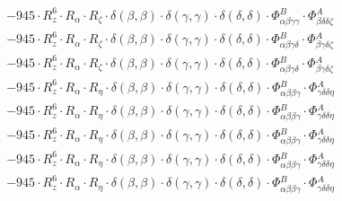 \documentclass{article}
\begin{document}
\begin{subequations}
\begin{gather}
\begin{array}{c}
 \\[0.2em] 		 - 945 \cdot R_{z}^{6} \cdot R_{\alpha{}} \cdot R_{\zeta{}} \cdot \delta{}\left(\beta{}, \beta{}\right) \cdot \delta{}\left(\gamma{}, \gamma{}\right) \cdot \delta{}\left(\delta{}, \delta{}\right) \cdot \Phi{}^{B}_{\alpha{}\beta{}\gamma{}\gamma{}} \cdot \Phi{}^{A}_{\beta{}\delta{}\delta{}\zeta{}} 
 \\[0.2em] 		 - 945 \cdot R_{z}^{6} \cdot R_{\alpha{}} \cdot R_{\zeta{}} \cdot \delta{}\left(\beta{}, \beta{}\right) \cdot \delta{}\left(\gamma{}, \gamma{}\right) \cdot \delta{}\left(\delta{}, \delta{}\right) \cdot \Phi{}^{B}_{\alpha{}\beta{}\gamma{}\delta{}} \cdot \Phi{}^{A}_{\beta{}\gamma{}\delta{}\zeta{}} 
 \\[0.2em] 		 - 945 \cdot R_{z}^{6} \cdot R_{\alpha{}} \cdot R_{\zeta{}} \cdot \delta{}\left(\beta{}, \beta{}\right) \cdot \delta{}\left(\gamma{}, \gamma{}\right) \cdot \delta{}\left(\delta{}, \delta{}\right) \cdot \Phi{}^{B}_{\alpha{}\beta{}\gamma{}\delta{}} \cdot \Phi{}^{A}_{\beta{}\gamma{}\delta{}\zeta{}} 
 \\[0.2em] 		 - 945 \cdot R_{z}^{6} \cdot R_{\alpha{}} \cdot R_{\eta{}} \cdot \delta{}\left(\beta{}, \beta{}\right) \cdot \delta{}\left(\gamma{}, \gamma{}\right) \cdot \delta{}\left(\delta{}, \delta{}\right) \cdot \Phi{}^{B}_{\alpha{}\beta{}\beta{}\gamma{}} \cdot \Phi{}^{A}_{\gamma{}\delta{}\delta{}\eta{}} 
 \\[0.2em] 		 - 945 \cdot R_{z}^{6} \cdot R_{\alpha{}} \cdot R_{\eta{}} \cdot \delta{}\left(\beta{}, \beta{}\right) \cdot \delta{}\left(\gamma{}, \gamma{}\right) \cdot \delta{}\left(\delta{}, \delta{}\right) \cdot \Phi{}^{B}_{\alpha{}\beta{}\beta{}\gamma{}} \cdot \Phi{}^{A}_{\gamma{}\delta{}\delta{}\eta{}} 
 \\[0.2em] 		 - 945 \cdot R_{z}^{6} \cdot R_{\alpha{}} \cdot R_{\eta{}} \cdot \delta{}\left(\beta{}, \beta{}\right) \cdot \delta{}\left(\gamma{}, \gamma{}\right) \cdot \delta{}\left(\delta{}, \delta{}\right) \cdot \Phi{}^{B}_{\alpha{}\beta{}\beta{}\gamma{}} \cdot \Phi{}^{A}_{\gamma{}\delta{}\delta{}\eta{}} 
 \\[0.2em] 		 - 945 \cdot R_{z}^{6} \cdot R_{\alpha{}} \cdot R_{\eta{}} \cdot \delta{}\left(\beta{}, \beta{}\right) \cdot \delta{}\left(\gamma{}, \gamma{}\right) \cdot \delta{}\left(\delta{}, \delta{}\right) \cdot \Phi{}^{B}_{\alpha{}\beta{}\beta{}\gamma{}} \cdot \Phi{}^{A}_{\gamma{}\delta{}\delta{}\eta{}} 
 \\[0.2em] 		 - 945 \cdot R_{z}^{6} \cdot R_{\alpha{}} \cdot R_{\eta{}} \cdot \delta{}\left(\beta{}, \beta{}\right) \cdot \delta{}\left(\gamma{}, \gamma{}\right) \cdot \delta{}\left(\delta{}, \delta{}\right) \cdot \Phi{}^{B}_{\alpha{}\beta{}\beta{}\gamma{}} \cdot \Phi{}^{A}_{\gamma{}\delta{}\delta{}\eta{}} 

\end{array}
\end{gather}
\end{subequations}
\end{document}

